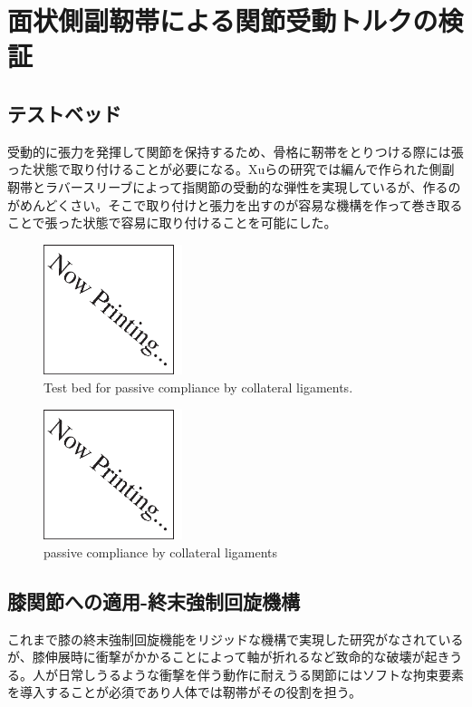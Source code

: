 \documentclass{jarticle}
\begin{document}
\section{面状側副靭帯による関節受動トルクの検証}

\subsection{テストベッド}
受動的に張力を発揮して関節を保持するため、骨格に靭帯をとりつける際には張った状態で取り付けることが必要になる。Xuらの研究\cite{ICRA2011:xu:hand}では編んで作られた側副靭帯とラバースリーブによって指関節の受動的な弾性を実現しているが、作るのがめんどくさい。そこで取り付けと張力を出すのが容易な機構を作って巻き取ることで張った状態で容易に取り付けることを可能にした。
\begin{figure}[tb]
 \centering
  \includegraphics[height=38mm]{figs/nowprinting.eps}
  \vspace*{-4mm}
  \caption{Test bed for passive compliance by collateral ligaments.}
  \label{fig:testbed}
\end{figure}

\begin{figure}[tb]
 \centering
  \includegraphics[height=38mm]{figs/nowprinting.eps}
  \vspace*{-4mm}
  \caption{passive compliance by collateral ligaments}
  \label{fig:passive-compliance}
\end{figure}

\subsection{膝関節への適用-終末強制回旋機構}
これまで膝の終末強制回旋機能をリジッドな機構で実現した研究\cite{IROS2013:asano:knee}がなされているが、膝伸展時に衝撃がかかることによって軸が折れるなど致命的な破壊が起きうる。人が日常しうるような衝撃を伴う動作に耐えうる関節にはソフトな拘束要素を導入することが必須であり人体では靭帯がその役割を担う。
\end{document}
